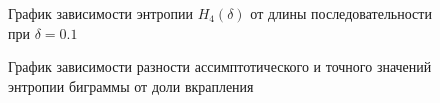 \documentclass[a4paper,12pt]{article}
\theoremstyle{plain}
\begin{document}
					\begin{figure}[h]
						\caption{График зависимости энтропии $H_4{(\delta)}$ от длины последовательности при  $\delta = 0.1$}
						\label{ris:"h4_01.png"}
					\end{figure}
						\begin{figure}[h]
							\caption{График зависимости разности ассимптотического и точного значений энтропии биграммы от доли вкрапления}
							\label{ris:"h4.png"}
						\end{figure}
					
\end{document}
